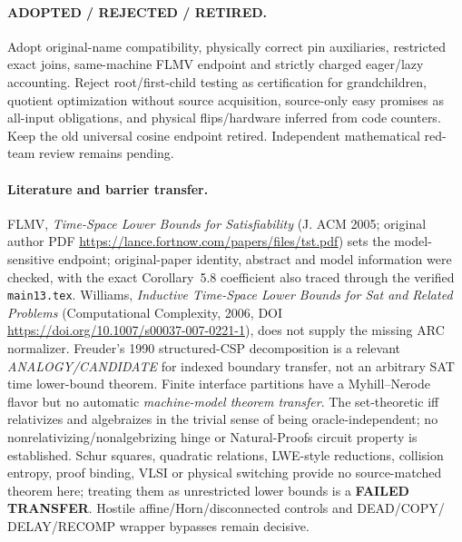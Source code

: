 \documentclass[11pt]{article}
\begin{document}
\paragraph{ADOPTED / REJECTED / RETIRED.}
Adopt original-name compatibility, physically correct pin
auxiliaries, restricted exact joins, same-machine FLMV endpoint
and strictly charged eager/lazy accounting.
Reject root/first-child testing as certification for
grandchildren, quotient optimization without source acquisition,
source-only easy promises as all-input obligations, and physical
flips/hardware inferred from code counters.
Keep the old universal cosine endpoint retired.
Independent mathematical red-team review remains pending.

\paragraph{Literature and barrier transfer.}
FLMV, \emph{Time-Space Lower Bounds for Satisfiability}
(J. ACM 2005; original author PDF
\url{https://lance.fortnow.com/papers/files/tst.pdf})
sets the model-sensitive endpoint; original-paper identity,
abstract and model information were checked, with the exact
Corollary~5.8 coefficient also traced through the verified
\texttt{main13.tex}. Williams,
\emph{Inductive Time-Space Lower Bounds for Sat and Related Problems}
(Computational Complexity, 2006, DOI
\url{https://doi.org/10.1007/s00037-007-0221-1}),
does not supply the missing ARC normalizer.
Freuder's 1990 structured-CSP decomposition is a relevant
\emph{ANALOGY/CANDIDATE} for indexed boundary transfer, not an
arbitrary SAT time lower-bound theorem. Finite interface
partitions have a Myhill--Nerode flavor but no automatic
\emph{machine-model theorem transfer}. The set-theoretic iff
relativizes and algebraizes in the trivial sense of being
oracle-independent; no nonrelativizing/nonalgebrizing hinge or
Natural-Proofs circuit property is established.
Schur squares, quadratic relations, LWE-style reductions,
collision entropy, proof binding, VLSI or physical switching
provide no source-matched theorem here; treating them as
unrestricted lower bounds is a \textbf{FAILED TRANSFER}.
Hostile affine/Horn/disconnected controls and DEAD/COPY/
DELAY/RECOMP wrapper bypasses remain decisive.
\end{document}

